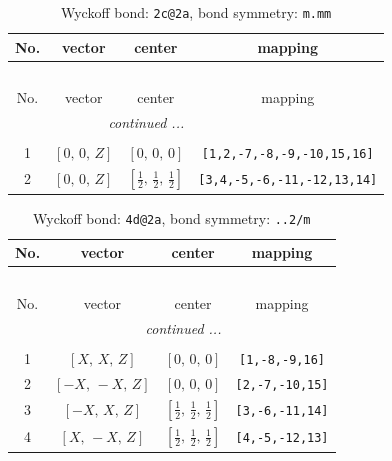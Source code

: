 \documentclass[fleqn,8pt]{jsarticle}
\begin{document}
\renewcommand{\arraystretch}{1.2}
\begin{longtable}{cccc}
\caption{Wyckoff bond: {\tt 2c@2a}, bond symmetry: {\tt m.mm}}
 \\
 \hline \hline
No. & vector & center & mapping \\ \hline \endfirsthead

\multicolumn{3}{l}{\tablename\ \thetable{}} \\
 \hline \hline
No. & vector & center & mapping \\ \hline \endhead

 \hline \hline
\multicolumn{3}{r}{\footnotesize\it continued ...} \\ \endfoot

 \hline \hline
\multicolumn{3}{r}{} \\ \endlastfoot

1 & $\left[ 0,\, 0,\, Z \right]$ & $\left[ 0,\, 0,\, 0 \right]$ & {\tt [1,2,-7,-8,-9,-10,15,16]} \\ \hline
2 & $\left[ 0,\, 0,\, Z \right]$ & $\left[ \frac{1}{2},\, \frac{1}{2},\, \frac{1}{2} \right]$ & {\tt [3,4,-5,-6,-11,-12,13,14]} \\
\end{longtable}
\renewcommand{\arraystretch}{1.2}
\begin{longtable}{cccc}
\caption{Wyckoff bond: {\tt 4d@2a}, bond symmetry: {\tt ..2/m}}
 \\
 \hline \hline
No. & vector & center & mapping \\ \hline \endfirsthead

\multicolumn{3}{l}{\tablename\ \thetable{}} \\
 \hline \hline
No. & vector & center & mapping \\ \hline \endhead

 \hline \hline
\multicolumn{3}{r}{\footnotesize\it continued ...} \\ \endfoot

 \hline \hline
\multicolumn{3}{r}{} \\ \endlastfoot

1 & $\left[ X,\, X,\, Z \right]$ & $\left[ 0,\, 0,\, 0 \right]$ & {\tt [1,-8,-9,16]} \\ \hline
2 & $\left[ - X,\, - X,\, Z \right]$ & $\left[ 0,\, 0,\, 0 \right]$ & {\tt [2,-7,-10,15]} \\ \hline
3 & $\left[ - X,\, X,\, Z \right]$ & $\left[ \frac{1}{2},\, \frac{1}{2},\, \frac{1}{2} \right]$ & {\tt [3,-6,-11,14]} \\ \hline
4 & $\left[ X,\, - X,\, Z \right]$ & $\left[ \frac{1}{2},\, \frac{1}{2},\, \frac{1}{2} \right]$ & {\tt [4,-5,-12,13]} \\
\end{longtable}
\end{document}
